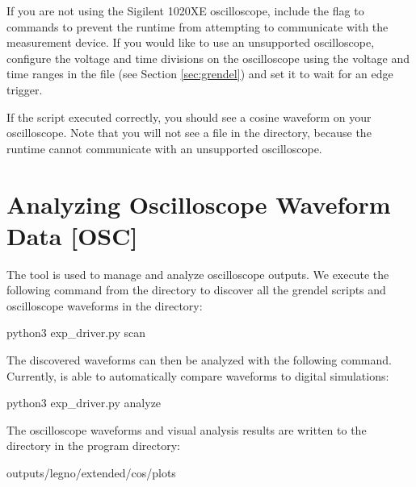 If you are not using the Sigilent 1020XE oscilloscope, include the
 flag to  commands to prevent the runtime
from attempting to communicate with the measurement device. If you would like to
use an unsupported oscilloscope, configure the voltage and time divisions on the
oscilloscope using the voltage and time ranges in the  file
(see Section \ref{sec:grendel}) and set it to wait for an edge trigger.

If the script executed correctly, you should see a cosine waveform on your
oscilloscope. Note that you will not see a  file in the 
directory, because the runtime cannot communicate with an unsupported oscilloscope.


\section{Analyzing Oscilloscope Waveform Data [OSC]}

The  tool is used to manage and analyze oscilloscope outputs.
We execute the following command from the  directory to
discover all the grendel scripts and oscilloscope waveforms in the 
directory:

\begin{snippet}
  python3 exp_driver.py scan
\end{snippet}

\noindent The discovered waveforms can then be analyzed with the following command.
Currently,  is able to automatically compare waveforms to digital
simulations:

\begin{snippet}
    python3 exp_driver.py analyze
\end{snippet}

The oscilloscope waveforms and visual analysis results are written to the
 directory in the program directory:

\begin{snippet}
  outputs/legno/extended/cos/plots
\end{snippet}


